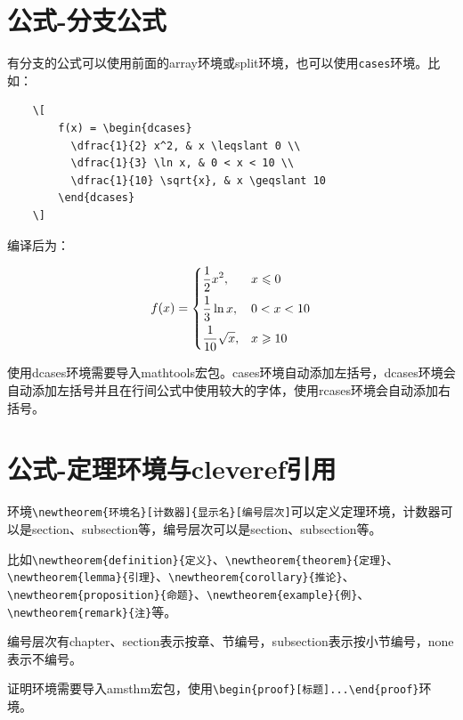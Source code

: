 \documentclass[12pt,a4paper]{ctexart}
\begin{document}
\section{公式-分支公式}
有分支的公式可以使用前面的array环境或split环境，也可以使用\verb|cases|环境。比如：
\begin{center}
  \begin{verbatim}
    \[
        f(x) = \begin{dcases}
          \dfrac{1}{2} x^2, & x \leqslant 0 \\
          \dfrac{1}{3} \ln x, & 0 < x < 10 \\
          \dfrac{1}{10} \sqrt{x}, & x \geqslant 10
        \end{dcases}
    \]
  \end{verbatim}
\end{center}
编译后为：
\begin{center}
  \[
    f(x) = \begin{dcases}
      \dfrac{1}{2} x^2, & x \leqslant 0 \\
      \dfrac{1}{3} \ln x, & 0 < x < 10 \\
      \dfrac{1}{10} \sqrt{x}, & x \geqslant 10
    \end{dcases}
  \]
\end{center}

使用dcases环境需要导入mathtools宏包。cases环境自动添加左括号，dcases环境会自动添加左括号并且在行间公式中使用较大的字体，使用rcases环境会自动添加右括号。

\section{公式-定理环境与cleveref引用}
环境\verb|\newtheorem{环境名}[计数器]{显示名}[编号层次]|可以定义定理环境，计数器可以是section、subsection等，编号层次可以是section、subsection等。

比如\verb|\newtheorem{definition}{定义}|、\verb|\newtheorem{theorem}{定理}|、\\\verb|\newtheorem{lemma}{引理}|、\verb|\newtheorem{corollary}{推论}|、\\\verb|\newtheorem{proposition}{命题}|、\verb|\newtheorem{example}{例}|、\\\verb|\newtheorem{remark}{注}|等。

编号层次有chapter、section表示按章、节编号，subsection表示按小节编号，none表示不编号。

证明环境需要导入amsthm宏包，使用\verb|\begin{proof}[标题]...\end{proof}|环境。
\end{document}
